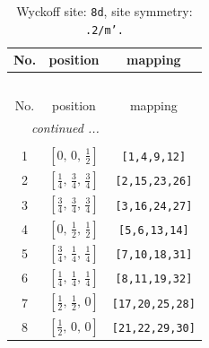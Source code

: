 \documentclass[fleqn,8pt]{jsarticle}
\begin{document}
\begin{longtable}{ccc}
\caption{Wyckoff site: {\tt 8d}, site symmetry: {\tt .2/m'.}}
 \\
 \hline \hline
No. & position & mapping \\ \hline \endfirsthead

\multicolumn{2}{l}{\tablename\ \thetable{}} \\
 \hline \hline
No. & position & mapping \\ \hline \endhead

 \hline \hline
\multicolumn{2}{r}{\footnotesize\it continued ...} \\ \endfoot

 \hline \hline
\multicolumn{2}{r}{} \\ \endlastfoot

1 & $\left[ 0,\, 0,\, \frac{1}{2} \right]$ & {\tt [1,4,9,12]} \\ \hline
2 & $\left[ \frac{1}{4},\, \frac{3}{4},\, \frac{3}{4} \right]$ & {\tt [2,15,23,26]} \\ \hline
3 & $\left[ \frac{3}{4},\, \frac{3}{4},\, \frac{3}{4} \right]$ & {\tt [3,16,24,27]} \\ \hline
4 & $\left[ 0,\, \frac{1}{2},\, \frac{1}{2} \right]$ & {\tt [5,6,13,14]} \\ \hline
5 & $\left[ \frac{3}{4},\, \frac{1}{4},\, \frac{1}{4} \right]$ & {\tt [7,10,18,31]} \\ \hline
6 & $\left[ \frac{1}{4},\, \frac{1}{4},\, \frac{1}{4} \right]$ & {\tt [8,11,19,32]} \\ \hline
7 & $\left[ \frac{1}{2},\, \frac{1}{2},\, 0 \right]$ & {\tt [17,20,25,28]} \\ \hline
8 & $\left[ \frac{1}{2},\, 0,\, 0 \right]$ & {\tt [21,22,29,30]} \\
\end{longtable}
\renewcommand{\arraystretch}{1.2}
\end{document}
